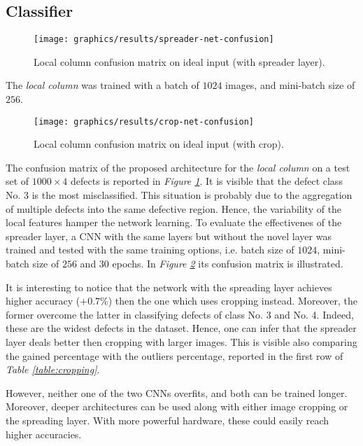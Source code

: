 \subsection{Classifier}\label{section:results:classifier}
\begin{figure}
	\centering
	\texttt{[image: graphics/results/spreader-net-confusion]}
	\caption{Local column confusion matrix on ideal input (with spreader layer).}\label{fig:local-confusion-spreader}
\end{figure}
\par{
	The \emph{local column} was trained with a batch of $1024$ images, and mini-batch size of $256$.
}
\begin{figure}
	\centering
	\texttt{[image: graphics/results/crop-net-confusion]}
	\caption{Local column confusion matrix on ideal input (with crop).}\label{fig:local-confusion-crop}
\end{figure}
\par{
	The confusion matrix of the proposed architecture for the \emph{local column} on a test set of $1000\times 4$ defects is reported in \emph{Figure \ref{fig:local-confusion-spreader}}. It is visible that the defect class No. 3 is the most misclassified. This situation is probably due to the aggregation of multiple defects into the same defective region. Hence, the variability of the local features hamper the network learning. To evaluate the effectivenes of the spreader layer, a CNN with the same layers but without the novel layer was trained and tested with the same training options, i.e. batch size of $1024$, mini-batch size of $256$ and $30$ epochs. In \emph{Figure \ref{fig:local-confusion-crop}} its confusion matrix is illustrated.
}
\par{
	It is interesting to notice that the network with the spreading layer achieves higher accuracy ($+0.7\%$) then the one which uses cropping instead. Moreover, the former overcome the latter in classifying defects of class No. 3 and No. 4. Indeed, these are the widest defects in the dataset. Hence, one can infer that the spreader layer deals better then cropping with larger images. This is visible also comparing the gained percentage with the outliers percentage, reported in the first row of \emph{Table \ref{table:cropping}}.
}
\par{
	However, neither one of the two CNNs overfits, and both can be trained longer. Moreover, deeper architectures can be used along with either image cropping or the spreading layer. With more powerful hardware, these could easily reach higher accuracies. 
}
